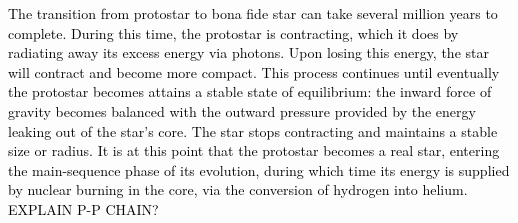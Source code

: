 \documentclass[main.tex]{subfiles}
\begin{document}
\begin{tcolorbox}[sharp corners, colback=red!30, colframe=red!80!blue, title=Box \refstepcounter{educhap1}\label{boxchap1:prot}\ref{boxchap1:prot} -- From Protostar to Bona Fide Star]
\par \textcolor{black} {The transition from protostar to bona fide star can take several million years to complete.  During this time, the protostar is contracting, which it does by radiating away its excess energy via photons.  Upon losing this energy, the star will contract and become more compact.  This process continues until eventually the protostar becomes attains a stable state of equilibrium:  the inward force of gravity becomes balanced with the outward pressure provided by the energy leaking out of the star's core.  The star stops contracting and maintains a stable size or radius.  It is at this point that the protostar becomes a real star, entering the main-sequence phase of its evolution, during which time its energy is supplied by nuclear burning in the core, via the conversion of hydrogen into helium. \\
EXPLAIN P-P CHAIN?}
\end{tcolorbox}

\end{document}
